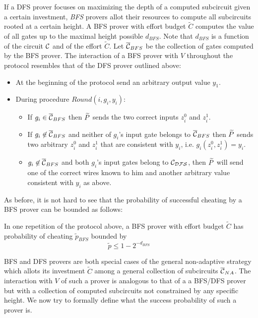 If a DFS prover focuses on maximizing the depth of a computed subcircuit given a certain investment, \emph{BFS} provers allot their resources to compute all subcircuits rooted at a certain height.
A BFS prover with effort budget $\tilde{C}$ computes the value of all gates up to the maximal height possible $d_{BFS}$. Note that $d_{BFS}$ is 
a function of the circuit $\cal C$ and of the effort $\tilde{C}$.  Let $ \overline{\cal{C}}_{BFS}$ be the 
collection of gates computed by the BFS prover. 
The interaction of a BFS prover with $V$ throughout the protocol resembles that of the DFS prover outlined above:
\begin{itemize}
	\item At the beginning of the protocol send an arbitrary output value $y_1$.
	\item During procedure $Round(i, g_i, y_i)$:
	\begin{itemize}
		\item If $g_i \in \overline{\cal{C}}_{BFS}$  then $\widetilde{P}$ sends the two correct inputs $z^0_i$ and $z^1_i$.
		\item If $g_i \not \in \overline{\cal{C}}_{BFS}$ and neither of $g_i$'s input gate belongs to $\overline{\cal{C}}_{BFS}$ then $\widetilde{P}$ sends two arbitrary $z^0_i$ and $z^1_i$ that are consistent with $y_i$, i.e. $g_i(z^0_i,z^1_i) = y_i$.
		\item $g_i \not \in \overline{\cal{C}}_{BFS}$ and both $g_i$'s input gates belong to $\cal{C}_{DFS}$, then $\widetilde{P}$ will send one of the correct wires known to him and another arbitrary value consistent with $y_i$ as above.
	\end{itemize} 
\end{itemize}
As before, it is not hard to see that the probability of successful cheating by a BFS prover can be bounded as follows: 

\begin{lemma}
\label{lem:BFS}
	In one repetition of the protocol above, a BFS prover with effort budget $\tilde{C}$ has probability of cheating $\tilde{p}_{BFS}$ bounded by
	$$ \tilde{p} \leq 1 - 2^{-d_{BFS}}$$
\end{lemma}

BFS and DFS provers are both special cases of the general non-adaptive strategy which allots its investment $\tilde{C}$ among a general collection of subcircuits $\overline{\cal{C}}_{NA}$.
The interaction with $V$ of such a prover is analogous to that of a a BFS/DFS prover but with a collection of computed subcircuits not constrained by any specific height. We now try to formally define what the success probability of such a prover is. 

